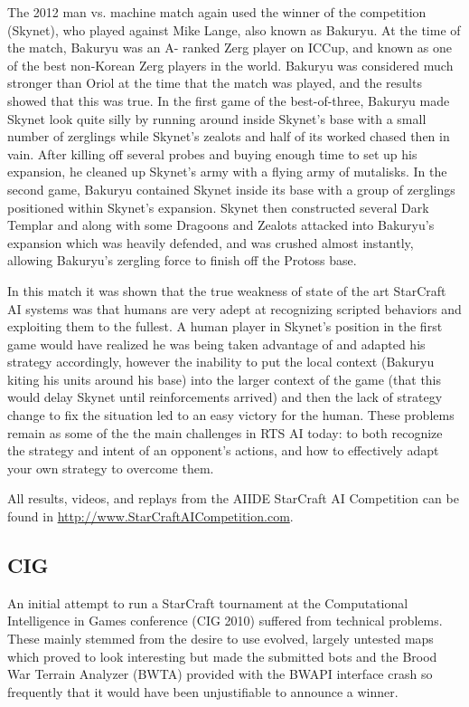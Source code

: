 \documentclass[journal]{IEEEtran}
\begin{document}
The 2012 man vs. machine match again used the winner of the competition (Skynet), who played against
Mike Lange, also known as Bakuryu. At the time of the match, Bakuryu was an A- ranked Zerg player on ICCup,
and known as one of the best non-Korean Zerg players in the world. Bakuryu was considered much
stronger than Oriol at the time that the match was played, and the results showed that this was true.
In the first game of the best-of-three, Bakuryu made Skynet look quite silly by running around inside
Skynet's base with a small number of zerglings while Skynet's zealots and half of its worked chased
then in vain. After killing off several probes and buying enough time to set up his expansion, he
cleaned up Skynet's army with a flying army of mutalisks. In the second game, Bakuryu contained Skynet
inside its base with a group of zerglings positioned within Skynet's expansion. Skynet then constructed
several Dark Templar and along with some Dragoons and Zealots attacked into Bakuryu's expansion which
was heavily defended, and was crushed almost instantly, allowing Bakuryu's zergling force to finish
off the Protoss base. 

In this match it was shown that the true weakness of state of the art StarCraft AI systems was that
humans are very adept at recognizing scripted behaviors and exploiting them to the fullest. A human
player in Skynet's position in the first game would have realized he was being taken advantage of and
adapted his strategy accordingly, however the inability to put the local context (Bakuryu kiting his
units around his base) into the larger context of the game (that this would delay Skynet until
reinforcements arrived) and then the lack of strategy change to fix the situation led to an easy
victory for the human. These problems remain as some of the the main challenges in RTS AI today: to both recognize
the strategy and intent of an opponent's actions, and how to effectively adapt your own strategy to 
overcome them.

All results, videos, and replays from the AIIDE StarCraft AI Competition can be found in \url{http://www.StarCraftAICompetition.com}.



\subsection{CIG}
\label{sec:cig2011}

An initial attempt to run a StarCraft tournament at the Computational
Intelligence in Games conference (CIG 2010) suffered from technical problems.
These mainly stemmed from the desire to use evolved, largely untested
maps which proved to look interesting but made the submitted bots and the Brood War Terrain Analyzer (BWTA) provided with the BWAPI interface crash
so frequently that it would have been unjustifiable to announce a winner.
\end{document}
